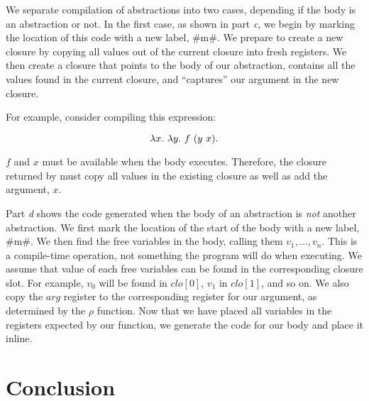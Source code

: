 \documentclass[12pt]{report}
\begin{document}
We separate compilation of abstractions into two cases, depending if
the body is an abstraction or not. In the first case, as shown in part
\emph{c}, we begin by marking the location of this code with a new label,
#m#. We prepare to create a new closure by copying all values out of
the current closure into fresh registers. We then create a closure that
points to the body of our abstraction, contains all the values found
in the current closure, and ``captures'' our argument in the new
closure. 

For example, consider compiling this expression:

\begin{equation}
  \lambda x.\ \lambda y.\ f\ (y\ x). 
\end{equation}

$f$ and $x$ must be available when the body
 executes. Therefore, the closure returned
by  must copy all values in the existing
closure as well as add the argument, $x$.

Part \emph{d} shows the code generated when the body of an abstraction
is \emph{not} another abstraction. We first mark the location of the
start of the body with a new label, #m#.  We then find the free
variables in the body, calling them $v_1, \dots, v_n$. This is a
compile-time operation, not something the program will do when
executing.  We assume that value of each free variables can be found
in the corresponding closure slot. For example, $v_0$ will be found in
$clo[0]$, $v_1$ in $clo[1]$, and so on. We also copy the $arg$
register to the corresponding register for our argument, as determined
by the $\rho$ function. Now that we have placed all variables in the
registers expected by our function, we generate the code for our body
and place it inline.

\section{Conclusion}
\end{document}
